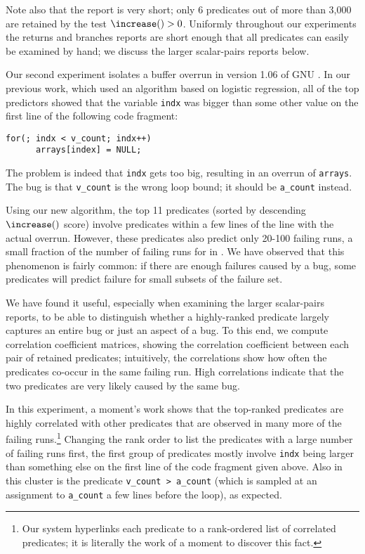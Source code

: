Note also that the report is very short; only 6 predicates out of more than 3,000 are retained by the test $\increase() > 0$.
Uniformly throughout our experiments the returns and branches reports are short enough that all predicates can
easily be examined by hand; we discuss the larger scalar-pairs reports below.

Our second experiment isolates a buffer overrun in version 1.06 of GNU \bc.  In our
previous work, which used an algorithm based on logistic regression, all of the top
predictors showed that the variable {\tt indx} was bigger than some other value on the first line of the following
code fragment:
\begin{verbatim}
for(; indx < v_count; indx++)
      arrays[index] = NULL;
\end{verbatim}
The problem is indeed that {\tt indx} gets too big, resulting in an overrun of {\tt arrays}.  The bug
is that {\tt v\_count} is the wrong loop bound; it should be {\tt a\_count} instead.  

Using our new algorithm, the top 11 predicates (sorted by descending
$\increase()$ score) involve predicates within a few lines of the line
with the actual overrun.  However, these predicates also predict only
20-100 failing runs, a small fraction of the number of failing runs
for \bc in .  We have observed that this
phenomenon is fairly common: if there are enough failures caused by a
bug, some predicates will predict failure for small subsets of the failure set.

We have found it useful, especially when examining the larger
scalar-pairs reports, to be able to distinguish whether a
highly-ranked predicate largely captures an entire bug or just an aspect of a bug.  To
this end, we compute correlation coefficient matrices, showing the correlation coefficient between each pair of retained predicates; 
intuitively, the
correlations show how often the predicates co-occur in the same failing run.  High correlations
indicate that the two predicates are very likely caused by the same bug.

In this experiment, a moment's work shows that the top-ranked predicates are highly
correlated with other predicates that are observed in many more of the
failing runs.\footnote{Our system hyperlinks each predicate to a
rank-ordered list of correlated predicates; it is literally the work
of a moment to discover this fact.}  Changing the rank order to list
the predicates with a large number of failing runs first, the first
group of predicates mostly involve {\tt indx} being larger than
something else on the first line of the code fragment given above.
Also in this cluster is the predicate {\tt v\_count > a\_count} (which is sampled at an assignment
to {\tt a\_count} a few lines before the loop), as
expected.

